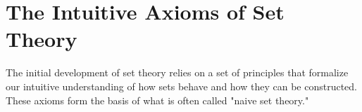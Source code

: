 \documentclass[11pt, a4paper]{article}
\author{Based on the work of P.R. Halmos and others}
\date{}
\begin{document}



\section{The Intuitive Axioms of Set Theory}
The initial development of set theory relies on a set of principles that formalize our intuitive understanding of how sets behave and how they can be constructed. These axioms form the basis of what is often called "naive set theory."
\end{document}

